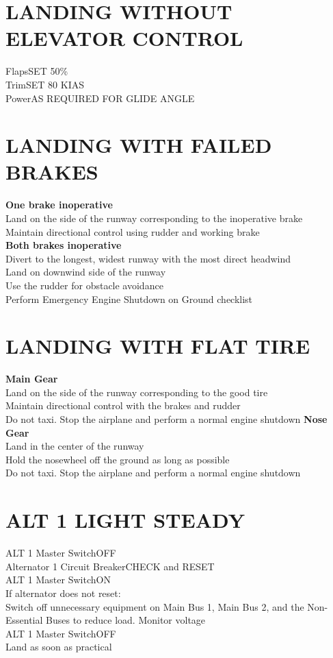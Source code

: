 \documentclass{article}
\begin{document}
\begin{multicols*}{2}
\section*{LANDING WITHOUT ELEVATOR CONTROL}
Flaps\dotfill SET 50\%\\
Trim\dotfill SET 80 KIAS\\
Power\dotfill AS REQUIRED FOR GLIDE ANGLE
\vfill\null
\section*{LANDING WITH FAILED BRAKES}
\textbf{One brake inoperative}\\
Land on the side of the runway corresponding to the inoperative brake\\
Maintain directional control using rudder and working brake\\
\textbf{Both brakes inoperative}\\
Divert to the longest, widest runway with the most direct headwind\\
Land on downwind side of the runway\\
Use the rudder for obstacle avoidance\\
Perform Emergency Engine Shutdown on Ground checklist
\section*{LANDING WITH FLAT TIRE}
\textbf{Main Gear}\\
Land on the side of the runway corresponding to the good tire\\
Maintain directional control with the brakes and rudder\\
Do not taxi. Stop the airplane and perform a normal engine shutdown
\textbf{Nose Gear}\\
Land in the center of the runway\\
Hold the nosewheel off the ground as long as possible\\
Do not taxi. Stop the airplane and perform a normal engine shutdown
\section*{ALT 1 LIGHT STEADY}
ALT 1 Master Switch\dotfill OFF\\
Alternator 1 Circuit Breaker\dotfill CHECK and RESET\\
ALT 1 Master Switch\dotfill ON\\
If alternator does not reset:\\
Switch off unnecessary equipment on Main Bus 1, Main Bus 2, and the Non-Essential Buses to reduce load. Monitor voltage\\
ALT 1 Master Switch\dotfill OFF\\
Land as soon as practical

\end{multicols*}
\end{document}
